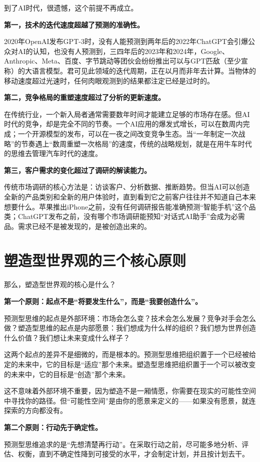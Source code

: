 到了AI时代，很遗憾，这个前提不再成立。

\textbf{第一，技术的迭代速度超越了预测的准确性。}

2020年OpenAI发布GPT-3时，没有人能预测到两年后的2022年ChatGPT会引爆公众对AI的认知，也没有人预测到，三四年后的2023年和2024年，Google、Anthropic、Meta、百度、字节跳动等团伙会纷纷推出可以与GPT匹敌（至少宣称）的大语言模型。君可见此领域的迭代周期，正在以月而非年去计算。当物体的移动速度超过光速时，任何肉眼观测到的结果都注定已经是过时的。

\textbf{第二，竞争格局的重塑速度超过了分析的更新速度。}

在传统行业，一个新入局者通常需要数年时间才能建立足够的市场存在感。但AI时代的竞争，却是完全不同的节奏。一个AI应用的爆发式增长，可以在数周内完成；一个开源模型的发布，可以在一夜之间改变竞争生态。当“一年制定一次战略”的节奏遇上“数周重塑一次格局”的速度，传统的战略规划，就是在用牛车时代的思维去管理汽车时代的速度。

\textbf{第三，客户需求的变化超过了调研的解读能力。}

传统市场调研的核心方法是：访谈客户、分析数据、推断趋势。但当AI可以创造全新的产品类别和全新的用户体验时，直到看到它之前客户往往并不知道自己本来想要什么。苹果推出iPhone之前，没有任何调研报告能准确预测“智能手机”这个品类；ChatGPT发布之前，没有哪个市场调研能预知“对话式AI助手”会成为必需品。需求已经不是被发现的，是被创造出来的。


\section{塑造型世界观的三个核心原则}


那么，塑造型世界观的核心是什么？

\textbf{第一个原则：起点不是“将要发生什么”，而是“我要创造什么”。}

预测型思维的起点是外部环境：市场会怎么变？技术会怎么发展？竞争对手会怎么做？塑造型思维的起点是内部愿景：我们想成为什么样的组织？我们想为世界创造什么价值？我们想让未来变成什么样子？

这两个起点的差异不是细微的，而是根本的。预测型思维把组织置于一个已经被给定的未来中，它的目标是“适应”那个未来。塑造型思维把组织置于一个可以被改变的未来中，它的目标是“创造”那个未来。

这不意味着外部环境不重要，因为塑造不是一厢情愿，你需要在现实的可能性空间中寻找你的路径。但“可能性空间”是由你的愿景来定义的——如果没有愿景，就连探索的方向都没有。

\textbf{第二个原则：行动先于确定性。}

预测型思维追求的是“先想清楚再行动”。在采取行动之前，尽可能多地分析、评估、权衡，直到不确定性降到可接受的水平，才会制定计划，并且按计划去干。

